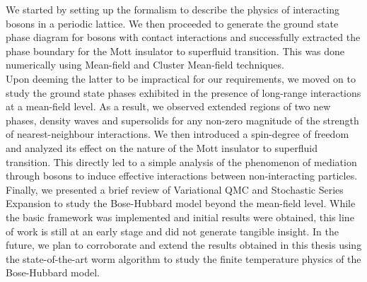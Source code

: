 We started by setting up the formalism to describe the physics of interacting bosons in a periodic lattice. We then proceeded to generate the ground state phase diagram for bosons with contact interactions and successfully extracted the phase boundary for the Mott insulator to superfluid transition. This was done numerically using Mean-field and Cluster Mean-field techniques.
\vspace{0.5cm}\\
Upon deeming the latter to be impractical for our requirements, we moved on to study the ground state phases exhibited in the presence of long-range interactions at a mean-field level. As a result, we observed extended regions of two new phases, density waves and supersolids for any non-zero magnitude of the strength of nearest-neighbour interactions. We then introduced a spin-degree of freedom and analyzed its effect on the nature of the Mott insulator to superfluid transition. This directly led to a simple analysis of the phenomenon of mediation through bosons to induce effective interactions between non-interacting particles.
\vspace{0.5cm}\\
Finally, we presented a brief review of Variational QMC and Stochastic Series Expansion to study the Bose-Hubbard model beyond the mean-field level. While the basic framework was implemented and initial results were obtained, this line of work is still at an early stage and did not generate tangible insight. In the future, we plan to corroborate and extend the results obtained in this thesis using the state-of-the-art worm algorithm to study the finite temperature physics of the Bose-Hubbard model.

